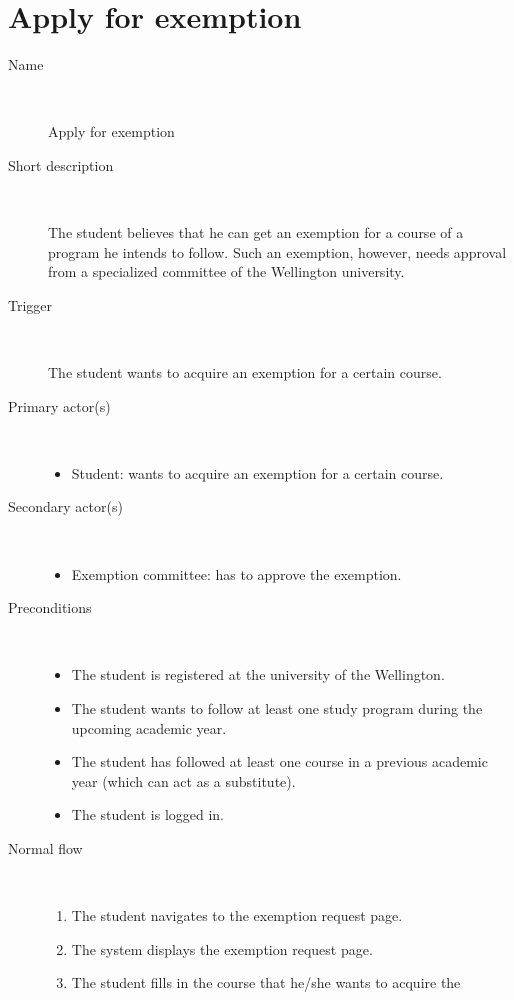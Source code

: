 \section{Apply for exemption}

\begin{description}
	\item[Name] \
		\par Apply for exemption
	\item[Short description] \ 
			\par The student believes that he can get an exemption for a course of a
			program he intends to follow. Such an exemption, however, needs approval from
			a specialized committee of the Wellington university.
	\item[Trigger] \ 
			\par The student wants to acquire an exemption for a certain course.
	\item[Primary actor(s)] \ 
		\begin{itemize}
		  \item Student: wants to acquire an exemption for a certain course.
		\end{itemize}
	\item[Secondary actor(s)] \ 
		\begin{itemize}
		  \item Exemption committee: has to approve the exemption.
		\end{itemize} 
	\item[Preconditions] \ 
	\begin{itemize}
		\item The student is registered at the university of the Wellington.
		\item The student wants to follow at least one study program during the upcoming academic year.
		\item The student has followed at least one course in a previous academic year
		(which can act as a substitute).
		\item The student is logged in.
	\end{itemize}
	\item[Normal flow] \ 
	\begin{enumerate}
	  	\item The student navigates to the exemption request page.
	  	\item The system displays the exemption request page.
	  	\item The student fills in the course that he/she wants to acquire the

\end{enumerate}
\end{description}
